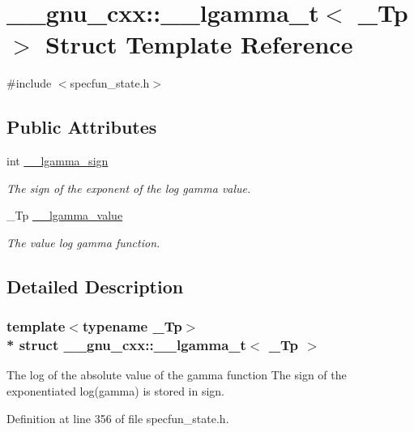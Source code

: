 \hypertarget{struct____gnu__cxx_1_1____lgamma__t}{}\section{\+\_\+\+\_\+gnu\+\_\+cxx\+:\+:\+\_\+\+\_\+lgamma\+\_\+t$<$ \+\_\+\+Tp $>$ Struct Template Reference}
\label{struct____gnu__cxx_1_1____lgamma__t}


{\ttfamily \#include $<$specfun\+\_\+state.\+h$>$}

\subsection*{Public Attributes}
\begin{DoxyCompactItemize}
\item 
int \hyperlink{struct____gnu__cxx_1_1____lgamma__t_a8aecdc9e5f69e729e96dc50f0c57b331}{\+\_\+\+\_\+lgamma\+\_\+sign}
\begin{DoxyCompactList}\small\item\em The sign of the exponent of the log gamma value. \end{DoxyCompactList}\item 
\+\_\+\+Tp \hyperlink{struct____gnu__cxx_1_1____lgamma__t_a916af5560acafd8dcf25c42fd28deef5}{\+\_\+\+\_\+lgamma\+\_\+value}
\begin{DoxyCompactList}\small\item\em The value log gamma function. \end{DoxyCompactList}\end{DoxyCompactItemize}


\subsection{Detailed Description}
\subsubsection*{template$<$typename \+\_\+\+Tp$>$\\*
struct \+\_\+\+\_\+gnu\+\_\+cxx\+::\+\_\+\+\_\+lgamma\+\_\+t$<$ \+\_\+\+Tp $>$}

The log of the absolute value of the gamma function The sign of the exponentiated log(gamma) is stored in sign. 

Definition at line 356 of file specfun\+\_\+state.\+h.



